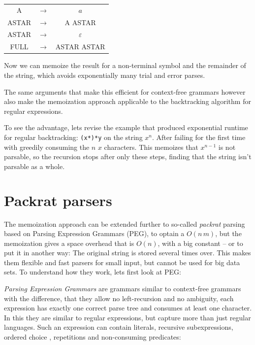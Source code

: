 \documentclass[11pt,a4paper,twoside,openright]{Thesis}
\theoremstyle{definition}
\begin{document}
\begin{center}
\begin{tabular}{ccc}
A& $\rightarrow$ & $a$\\
ASTAR & $\rightarrow$ & A ASTAR \\
ASTAR & $\rightarrow$ & $\varepsilon$ \\
FULL & $\rightarrow$ & ASTAR ASTAR \\
\end{tabular}
\end{center}

Now we can memoize the result for a non-terminal symbol and the remainder of
the string, which avoids exponentially many trial and error parses.

The same arguments that make this efficient for context-free grammars however 
also make the memoization approach applicable to the backtracking algorithm 
for regular expressions.

To see the advantage, lets revise the example that produced exponential runtime
for regular backtracking: \texttt{(x*)*y} on the string $x^n$. After failing 
for the first time with greedily consuming the $n$ $x$ characters. This 
memoizes that $x^{n-1}$ is not parsable, so the recursion stops after only 
these steps, finding that the string isn't parsable as a whole.

\section{Packrat parsers}
The memoization approach can be extended further to so-called \emph{packrat}
parsing\cite{Mede12a} based on Parsing Expression Grammars (PEG), to optain a
$O(n\,m)$, but the memoization gives a space overhead that is
$O(n)$, with a big constant\cite{Ford02a} -- or to put it in another way: The
original string is stored several times over. This makes them flexible and fast
parsers for small input, but cannot be used for big data sets. To understand
how they work, lets first look at PEG:

\emph{Parsing Expression Grammars} are grammars similar to context-free 
grammars with the difference, that they allow no left-recursion and no
ambiguity, each expression has exactly one correct parse tree and consumes at 
least one character. In this they are similar to regular expressions, but
capture more than just regular languages.  Such an expression can contain
literals, recursive subexpressions, ordered choice , repetitions and
non-consuming predicates:
\end{document}
